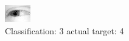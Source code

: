\begin{figure}[h!]
\begin{center}
\includegraphics[width=0.60\columnwidth]{figures/ID2486_class_3_target_4.png}
\end{center}
\caption{ Classification: 3 actual target: 4}
\label{fig:ID2486_class_3_target_4}
\end{figure}
